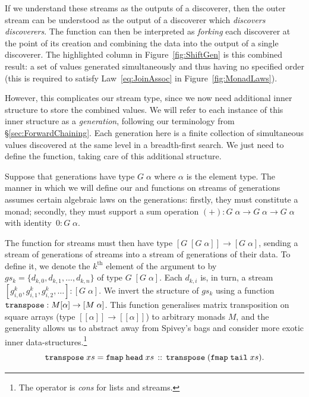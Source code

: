 If we understand these streams as the outputs of a discoverer, then the outer stream can be understood as the output of a discoverer which \emph{discovers discoverers}. The  function can then be interpreted as \emph{forking} each discoverer at the point of its creation and combining the data into the output of a single discoverer. The highlighted column in Figure~\ref{fig:ShiftGen} is this combined result: a set of values generated simultaneously and thus having no specified order (this is required to satisfy Law~\ref{eq:JoinAssoc} in Figure~\ref{fig:MonadLaws}).

However, this complicates our stream type, since we now need additional inner structure to store the combined values. We will refer to each instance of this inner structure as a \emph{generation}, following our terminology from \S\ref{sec:ForwardChaining}. Each generation here is a finite collection of simultaneous values discovered at the same level in a breadth-first search. We just need to define the  function, taking care of this additional structure.

Suppose that generations have type $G\;\alpha$ where $\alpha$ is the element type. The manner in which we will define our  and  functions on streams of generations assumes certain algebraic laws on the generations: firstly, they must constitute a monad; secondly, they must support a sum operation \mbox{$(+):G\;\alpha\rightarrow G\;\alpha\rightarrow G\;\alpha$} with identity~$0:G\;\alpha$. 

The  function for streams must then have type $[G\;[G\;\alpha]] \rightarrow [G\;\alpha]$, sending a stream of generations of streams into a stream of generations of their data. To define it, we denote the $k^{\text{th}}$ element of the argument to  by $gs_k = \{d_{k,0}, d_{k,1}, \ldots, d_{k,n}\}$ of type $G\;[G\;\alpha]$. Each $d_{k,i}$ is, in turn, a stream $[g^k_{i,0}, g^k_{i,1}, g^k_{i,2}, \ldots] : [G\;\alpha]$. We invert the structure of $gs_k$ using a function $\texttt{transpose}  : M[\alpha]\rightarrow [M\;\alpha]$. This function generalises matrix transposition on square arrays (type $[[\alpha]]\rightarrow[[\alpha]]$) to arbitrary monads $M$, and the generality allows us to abstract away from Spivey's bags and consider more exotic inner data-structures.\footnote{The operator \code{::} is \emph{cons} for lists and streams.}
\begin{displaymath}
\texttt{transpose}\;xs = \texttt{fmap}\;\texttt{head}\;xs\,::\,\texttt{transpose}\; (\texttt{fmap}\;\texttt{tail}\;xs).
\end{displaymath}

